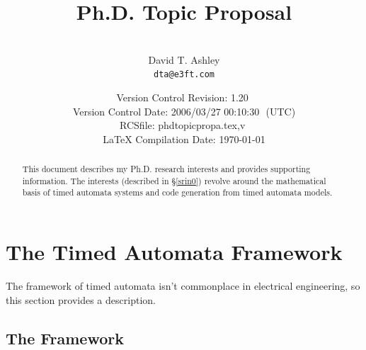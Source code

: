 \documentclass[letterpaper,10pt,titlepage]{article}
\begin{document}
\title{Ph.D. Topic Proposal}
\author{\vspace{2cm}\\David T. Ashley\\\texttt{dta@e3ft.com}\\\vspace{2cm}}
\date{\vspace*{8mm}\small{Version Control $ $Revision: 1.20 $ $ \\
      Version Control $ $Date: 2006/03/27 00:10:30 $ $ (UTC) \\
      $ $RCSfile: phdtopicpropa.tex,v $ $ \\
      \LaTeX{} Compilation Date: \today{}}}
\maketitle

%
\begin{abstract}
This document describes my Ph.D. research interests and provides
supporting information.  The interests
(described in \S{}\ref{srin0}) revolve around the mathematical
basis of timed automata systems and code generation
from timed automata models. 
\end{abstract}

\clearpage{}
\tableofcontents{}
\clearpage{}
\listoffigures
\clearpage{}

%
\setcounter{page}{1}

\section{The Timed Automata Framework}
\label{staf0}

The framework of timed automata isn't commonplace in electrical
engineering, so this section provides 
a description.



\subsection{The Framework}
\label{staf0:stfw0}
\end{document}
